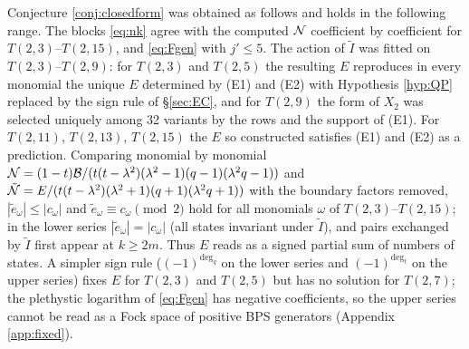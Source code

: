 \begin{result}\label{cr:principle}
Conjecture \ref{conj:closedform} was obtained as follows and holds in the following range. The blocks \eqref{eq:nk} agree with the computed $\mathcal{N}$ coefficient by coefficient for $T(2,3)$--$T(2,15)$, and \eqref{eq:Fgen} with $j' \le 5$. The action of $\tilde I$ was fitted on $T(2,3)$--$T(2,9)$: for $T(2,3)$ and $T(2,5)$ the resulting $E$ reproduces in every monomial the unique $E$ determined by (E1) and (E2) with Hypothesis \ref{hyp:QP} replaced by the sign rule of \S\ref{sec:EC}, and for $T(2,9)$ the form of $X_{2}$ was selected uniquely among 32 variants by the rows and the support of (E1). For $T(2,11)$, $T(2,13)$, $T(2,15)$ the $E$ so constructed satisfies (E1) and (E2) as a prediction. Comparing monomial by monomial $\mathcal{N} = (1-t)\mathcal{B}/(t(t-\lambda^2)(\lambda^2-1)(q-1)(\lambda^2q-1))$ and $\tilde{\mathcal{N}} = E/(t(t-\lambda^2)(\lambda^2+1)(q+1)(\lambda^2q+1))$ with the boundary factors removed, $|\tilde e_\omega| \le |c_\omega|$ and $\tilde e_\omega \equiv c_\omega \pmod 2$ hold for all monomials $\omega$ of $T(2,3)$--$T(2,15)$; in the lower series $|\tilde e_\omega| = |c_\omega|$ (all states invariant under $\tilde I$), and pairs exchanged by $\tilde I$ first appear at $k \ge 2m$. Thus $E$ reads as a signed partial sum of numbers of states. A simpler sign rule ($(-1)^{\deg_q}$ on the lower series and $(-1)^{\deg_t}$ on the upper series) fixes $E$ for $T(2,3)$ and $T(2,5)$ but has no solution for $T(2,7)$; the plethystic logarithm of \eqref{eq:Fgen} has negative coefficients, so the upper series cannot be read as a Fock space of positive BPS generators (Appendix \ref{app:fixed}).
\end{result}

